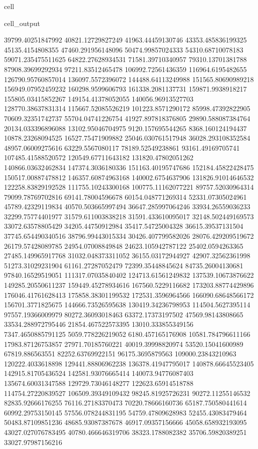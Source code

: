 \documentclass[letterpaper,10pt,english]{jupyterBook}
\begin{document}
\begin{sphinxuseclass}{cell}
\begin{sphinxVerbatimOutput}
\begin{sphinxuseclass}{cell_output}
\begin{sphinxVerbatim}[commandchars=\\\{\}]
39799.40251847992  40821.12729827249  41963.44459130746  43353.485836199325  45135.4154808355  47460.291956148096  50474.99857024333  54310.68710078183  59071.235475511625  64822.27628934531  71581.39710340957  79310.13701381788  87908.39699292934  97211.83512465478  106992.72561436359  116964.6195482655  126790.95760857014  136097.5572396072  144488.64113249988  151565.80690989218  156949.07952459232  160298.9599606793  161338.2081137731  159871.9938918217  155805.03415852267  149154.41378052055  140056.96913527703  128770.38637831314  115667.52085526219  101223.8571290172  85998.47392822905  70609.32351742737  55704.04741226754  41927.897818376805  29890.588087384764  20134.033396896088  13102.95046704975  9120.157695544265  8368.160124194437  10878.23268094525  16527.75471909882  25046.030761517948  36028.293108352584  48957.06009275616  63229.5567080117  78189.52549238861  93161.49169705741  107485.41588520572  120549.67711643182  131820.47802051262  140866.03632462834  147374.3036180336  151163.40195747686  152184.45822428475  150517.00887478812  146357.60874963168  140002.6754637906  131826.91014646532  122258.83829192528  111755.10243300168  100775.11162077221  89757.52030964314  79099.78769702816  69141.78004596678  60154.048771269314  52331.07305024961  45789.42329119834  40570.503665997494  36647.285997064246  33934.26559036233  32299.75774401977  31579.611003838218  31591.433610095017  32148.502449169573  33072.63578805429  34205.44750912984  35417.54725004328  36615.39537131504  37745.654490340516  38796.99443015334  
30426.407799582026  28076.429209519672  26179.57428089785  24954.07008849848  24623.105942787122  25402.0594263365  27485.149965917768  31032.048373311052  36155.03172944927  42907.32562361998  51273.31029231904  61161.27287052479  72399.35448845624  84735.26004130681  97840.16529519051  111317.07035840402  124713.61561249832  137539.10673876622  149285.20550611237  159449.45278934616  167560.5229116682  173203.88774429896  176046.41761628413  175858.38301199532  172531.3596964566  166090.68648566172  156701.3771825675  144666.73526595638  130419.34236798953  114504.5627395114  97557.19366009979  80272.36093018463  63372.17373197502  47569.98143808665  33534.288972795446  21854.467522573395  13010.333855349156  7347.4650885791125  5059.778226219052  6180.457165176908  10581.784796611166  17983.87126753857  27971.70185760221  40019.39998820974  53520.15041600989  67819.886563551  82252.63769922151  96175.3695879563  109000.23843210963  120222.4033618898  129441.88806962238  136378.41947795017  140878.66645523405  142915.81705436524  142581.93076665414  140073.94776087403  135674.60031347588  129729.73046148277  122623.65914518788  114754.27220839527  106509.39349109432  98245.81925726231  90272.11255146532  82835.92666176255  76116.27183370473  70220.78666160736  65187.750580441614  60992.29753150145  57556.078244831195  54759.47809628983  52455.43083479464  50483.87109851236  48685.93087387678  46917.09357156666  45058.658932193095  43027.027076783495  40780.466646319706  38323.1788082382  35706.59820389251  33027.97987156216  

\end{sphinxVerbatim}
\end{sphinxuseclass}
\end{sphinxVerbatimOutput}
\end{sphinxuseclass}
\end{document}
